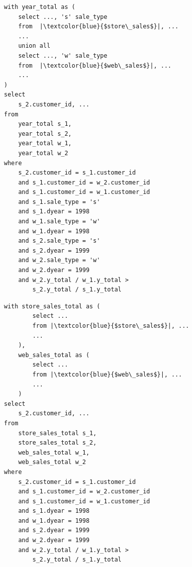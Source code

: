 \begin{listing}[ht]
  \centering
  \begin{minipage}[t]{0.48\linewidth}
    \begin{framed}
      \vspace{-3mm} %
      \begin{lstlisting}
with year_total as (
    select ..., 's' sale_type
    from  |\textcolor{blue}{$store\_sales$}|, ...
    ...
    union all
    select ..., 'w' sale_type
    from  |\textcolor{blue}{$web\_sales$}|, ...
    ...
)
select
    s_2.customer_id, ...
from
    year_total s_1,
    year_total s_2,
    year_total w_1,
    year_total w_2
where
    s_2.customer_id = s_1.customer_id
    and s_1.customer_id = w_2.customer_id
    and s_1.customer_id = w_1.customer_id
    and s_1.sale_type = 's'
    and s_1.dyear = 1998
    and w_1.sale_type = 'w'
    and w_1.dyear = 1998
    and s_2.sale_type = 's'
    and s_2.dyear = 1999
    and w_2.sale_type = 'w'
    and w_2.dyear = 1999
    and w_2.y_total / w_1.y_total > 
        s_2.y_total / s_1.y_total
      \end{lstlisting}
      \vspace{-3mm}
    \end{framed}
    \vspace{-2mm}
    \caption*{(a) TPC-DS Q11 Original}
  \end{minipage}
  \hfill
  \begin{minipage}[t]{0.48\linewidth}
    \begin{framed}
      \vspace{-3mm}
      \begin{lstlisting}
with store_sales_total as (
        select ...
        from |\textcolor{blue}{$store\_sales$}|, ...
        ...
    ),
    web_sales_total as (
        select ...
        from |\textcolor{blue}{$web\_sales$}|, ...
        ...
    )
select
    s_2.customer_id, ...
from
    store_sales_total s_1,
    store_sales_total s_2,
    web_sales_total w_1,
    web_sales_total w_2
where
    s_2.customer_id = s_1.customer_id
    and s_1.customer_id = w_2.customer_id
    and s_1.customer_id = w_1.customer_id
    and s_1.dyear = 1998
    and w_1.dyear = 1998
    and s_2.dyear = 1999
    and w_2.dyear = 1999
    and w_2.y_total / w_1.y_total > 
        s_2.y_total / s_1.y_total
      \end{lstlisting}
      \vspace{-3mm}
    \end{framed}
    \vspace{-2mm}
    \caption*{(b) TPC-DS Q11 Rewritten}
  \end{minipage}

  \vspace{1mm}
  \captionsetup{font=small}
  \caption{Left: Original TPC-DS Q11 query. Right: A rewrite of Q11 generated by LLMs. The rewrite is 9x faster, though no existing rewrite rules can achieve this transformation.}
  \label{gen:listing:q11}
\end{listing}





